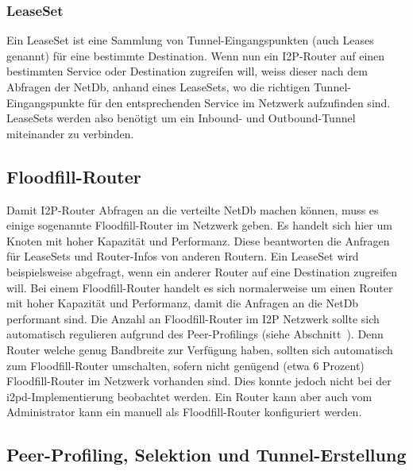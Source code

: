 \subsubsection{LeaseSet}

Ein LeaseSet ist eine Sammlung von Tunnel-Eingangspunkten (auch Leases genannt) für eine bestimmte Destination.
Wenn nun ein I2P-Router auf einen bestimmten Service oder Destination zugreifen will,
weiss dieser nach dem Abfragen der NetDb, anhand eines LeaseSets,
wo die richtigen Tunnel-Eingangspunkte für den entsprechenden Service im Netzwerk aufzufinden sind.
LeaseSets werden also benötigt um ein Inbound- und Outbound-Tunnel miteinander zu verbinden.
\cite{astolfi_i2p_2015}

\subsection{Floodfill-Router}

Damit I2P-Router Abfragen an die verteilte NetDb machen können, muss es einige sogenannte Floodfill-Router im Netzwerk geben. Es handelt sich hier um Knoten mit hoher Kapazität und Performanz.
Diese beantworten die Anfragen für LeaseSets und Router-Infos von anderen Routern.
Ein LeaseSet wird beispielsweise abgefragt, wenn ein anderer Router auf eine Destination zugreifen will.
Bei einem Floodfill-Router handelt es sich normalerweise um einen Router mit hoher Kapazität und Performanz, damit die Anfragen an die NetDb performant sind.
Die Anzahl an Floodfill-Router im I2P Netzwerk sollte sich automatisch regulieren aufgrund des Peer-Profilings (siehe Abschnitt~).
Denn Router welche genug Bandbreite zur Verfügung haben, sollten sich automatisch zum Floodfill-Router umschalten, sofern nicht genügend (etwa 6 Prozent) Floodfill-Router im Netzwerk vorhanden sind.
Dies konnte jedoch nicht bei der i2pd-Implementierung beobachtet werden.
Ein Router kann aber auch vom Administrator kann ein manuell als Floodfill-Router konfiguriert werden.
\parencite[S.~5-6]{timpanaro_monitoring_2011}

\subsection{Peer-Profiling, Selektion und Tunnel-Erstellung}\label{sec:tunnelerstellung}

